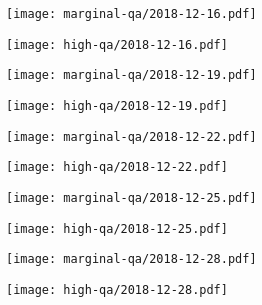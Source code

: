 \documentclass{article}
\begin{document}
\begin{figure}[H]
	\ContinuedFloat
	\centering
	\begin{subfigure}{0.48\linewidth}
		\texttt{[image: marginal-qa/2018-12-16.pdf]}
	\end{subfigure}
	\begin{subfigure}{0.48\linewidth}
		\texttt{[image: high-qa/2018-12-16.pdf]}
	\end{subfigure}
	\begin{subfigure}{0.48\linewidth}
		\texttt{[image: marginal-qa/2018-12-19.pdf]}
	\end{subfigure}
	\begin{subfigure}{0.48\linewidth}
		\texttt{[image: high-qa/2018-12-19.pdf]}
	\end{subfigure}
	\begin{subfigure}{0.48\linewidth}
		\texttt{[image: marginal-qa/2018-12-22.pdf]}
	\end{subfigure}
	\begin{subfigure}{0.48\linewidth}
		\texttt{[image: high-qa/2018-12-22.pdf]}
	\end{subfigure}
	\begin{subfigure}{0.48\linewidth}
		\texttt{[image: marginal-qa/2018-12-25.pdf]}
	\end{subfigure}
	\begin{subfigure}{0.48\linewidth}
		\texttt{[image: high-qa/2018-12-25.pdf]}
	\end{subfigure}
	\begin{subfigure}{0.48\linewidth}
		\texttt{[image: marginal-qa/2018-12-28.pdf]}
	\end{subfigure}
	\begin{subfigure}{0.48\linewidth}
		\texttt{[image: high-qa/2018-12-28.pdf]}
	\end{subfigure}
\end{figure}
\end{document}
